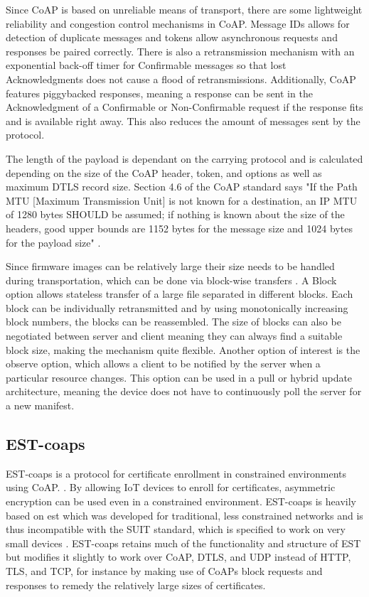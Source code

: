 \documentclass[0-thesis.tex]{subfiles}
\begin{document}
Since CoAP is based on unreliable means of transport, there are some lightweight
reliability and congestion control mechanisms in CoAP. Message IDs allows for detection of
duplicate messages and tokens allow asynchronous requests and responses be paired
correctly. There is also a retransmission mechanism with an exponential back-off timer for
Confirmable messages so that lost Acknowledgments does not cause a flood of
retransmissions. Additionally, CoAP features piggybacked responses, meaning a response can
be sent in the Acknowledgment of a Confirmable or Non-Confirmable request if the response
fits and is available right away. This also reduces the amount of messages sent by the
protocol.

The length of the payload is dependant on the carrying protocol and is calculated
depending on the size of the CoAP header, token, and options as well as maximum DTLS
record size. Section 4.6 of the CoAP standard says "If the Path MTU [Maximum Transmission
Unit] is not known for a destination, an IP MTU of 1280 bytes SHOULD be assumed; if
nothing is known about the size of the headers, good upper bounds are 1152 bytes for the
message size and 1024 bytes for the payload size" \parencite{rfc7252}.

Since firmware images can be relatively large their size needs to be handled during
transportation, which can be done via block-wise transfers \parencite{rfc7959}. A Block
option allows stateless transfer of a large file separated in different blocks. Each block
can be individually retransmitted and by using monotonically increasing block numbers, the
blocks can be reassembled. The size of blocks can also be negotiated between server and
client meaning they can always find a suitable block size, making the mechanism quite
flexible. Another option of interest is the observe option, which allows a client to be
notified by the server when a particular resource changes. This option can be used in a
pull or hybrid update architecture, meaning the device does not have to continuously poll
the server for a new manifest.

\subsection{EST-coaps}
\label{ssec:est-coaps}
EST-coaps is a protocol for certificate enrollment in constrained environments using CoAP.
\parencite{est-coaps}. By allowing IoT devices to enroll for certificates, asymmetric
encryption can be used even in a constrained environment. EST-coaps is heavily based on
\gls{est} which was developed for traditional, less constrained networks and is thus
incompatible with the SUIT standard, which is specified to work on very small devices
\parencite{rfc7030}. EST-coaps retains much of the functionality and structure of EST but
modifies it slightly to work over CoAP, DTLS, and UDP instead of HTTP, TLS, and TCP, for
instance by making use of CoAPs block requests and responses to remedy the relatively
large sizes of certificates.
\end{document}
